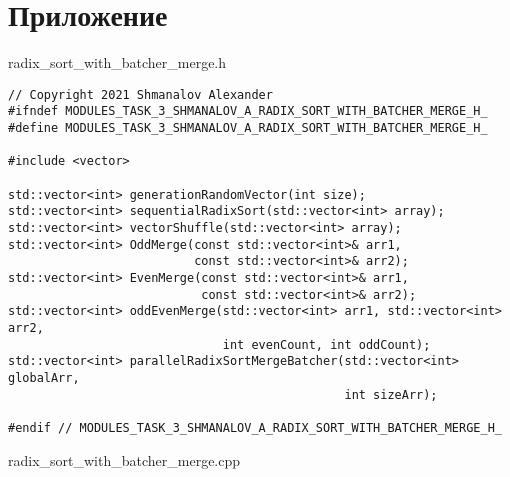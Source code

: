 \documentclass{report}
\begin{document}
\section*{Приложение}
\par radix\_sort\_with\_batcher\_merge.h
\begin{lstlisting}
// Copyright 2021 Shmanalov Alexander
#ifndef MODULES_TASK_3_SHMANALOV_A_RADIX_SORT_WITH_BATCHER_MERGE_H_
#define MODULES_TASK_3_SHMANALOV_A_RADIX_SORT_WITH_BATCHER_MERGE_H_

#include <vector>

std::vector<int> generationRandomVector(int size);
std::vector<int> sequentialRadixSort(std::vector<int> array);
std::vector<int> vectorShuffle(std::vector<int> array);
std::vector<int> OddMerge(const std::vector<int>& arr1, 
                          const std::vector<int>& arr2);
std::vector<int> EvenMerge(const std::vector<int>& arr1, 
                           const std::vector<int>& arr2);
std::vector<int> oddEvenMerge(std::vector<int> arr1, std::vector<int> arr2, 
                              int evenCount, int oddCount);
std::vector<int> parallelRadixSortMergeBatcher(std::vector<int> globalArr, 
                                               int sizeArr);

#endif // MODULES_TASK_3_SHMANALOV_A_RADIX_SORT_WITH_BATCHER_MERGE_H_
\end{lstlisting}
\par radix\_sort\_with\_batcher\_merge.cpp
\end{document}
